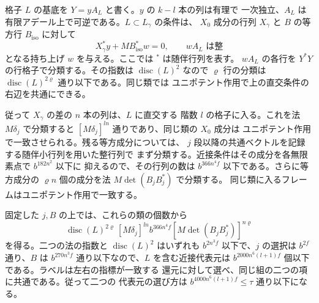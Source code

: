 格子 \(L\) の基底を \(Y=yA_L\) と書く。\(y\) の \(k-l\) 本の列は有理で
一次独立、\(A_L\) は有限アデール上で可逆である。\(L\subset L_\gamma\) の条件は、
\(X_0\) 成分の行列 \(X_\gamma\) と \(B\) の等方行 \(B_{\mathrm{iso}}\) に対して
\[
 X_\gamma^*y+M B_{\mathrm{iso}}^*w=0,\qquad
 wA_L\text{ は整}
\]
となる持ち上げ \(w\) を与える。ここでは \({}^*\) は随伴行列を表す。
\(wA_L\) の各行を \(Y^*Y\) の行格子で分類する。その指数は
\(\operatorname{disc}(L)^2\) なので \(\varrho\) 行の分類は
\(\operatorname{disc}(L)^{2\varrho}\) 通り以下である。同じ類では
ユニポテント作用で上の直交条件の右辺を共通にできる。

従って \(X_\gamma\) の差の \(n\) 本の列は、\(L\) に直交する
階数 \(l\) の格子に入る。これを法 \(M\delta_j\) で分類すると
\([M\delta_j]^{ln}\) 通りであり、同じ類の \(X_0\) 成分は
ユニポテント作用で一致させられる。残る等方成分については、
\(j\) 段以降の共通ベクトルを記録する随伴小行列を用いた整行列で
まず分類する。近接条件はその成分を各無限素点で \(b^{182n^2}\) 以下に
抑えるので、その行列の数は \(b^{366n^4 f}\) 以下である。さらに等方成分の
\(\varrho n\) 個の成分を法 \(M\det(B_j B_j^*)\) で分類する。
同じ類に入るフレームはユニポテント作用で一致する。

固定した \(j,B\) の上では、これらの類の個数から
\[
 \operatorname{disc}(L)^{2\varrho}\,[M\delta_j]^{ln}
       b^{366n^4 f}[M\det(B_j B_j^*)]^{n\varrho}
\]
を得る。二つの法の指数と \(\operatorname{disc}(L)^2\) はいずれも
\(b^{2n^3f}\) 以下で、\(j\) の選択は \(b^{2f}\) 通り、\(B\) は
\(b^{270n^3f}\) 通り以下なので、\(L\) を含む近接代表元は
\(b^{2000n^6(l+1)f}\) 個以下である。ラベルは左右の指標が一致する
還元に対して選べ、同じ組の二つの項に共通である。従って二つの
代表元の選び方は \(b^{4000n^6(l+1)f}\le\tau\) 通り以下になる。

